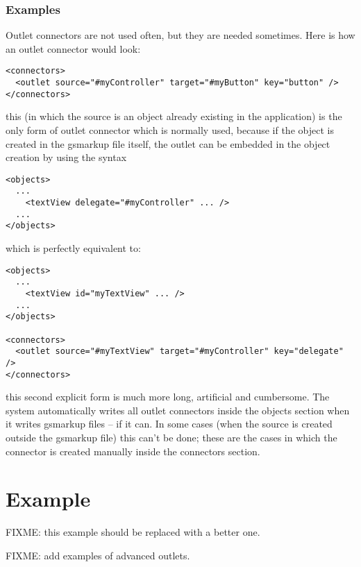 \subsubsection{Examples}
Outlet connectors are not used often, but they are needed sometimes.
Here is how an outlet connector would look:
\begin{verbatim}
<connectors>
  <outlet source="#myController" target="#myButton" key="button" />
</connectors>
\end{verbatim}
this (in which the source is an object already existing in the
application) is the only form of outlet connector which is normally
used, because if the object is created in the gsmarkup file itself, the outlet
can be embedded in the object creation by using the syntax
\begin{verbatim}
<objects>
  ...
    <textView delegate="#myController" ... />
  ...
</objects>
\end{verbatim}
which is perfectly equivalent to:
\begin{verbatim}
<objects>
  ...
    <textView id="myTextView" ... />
  ...
</objects>

<connectors>
  <outlet source="#myTextView" target="#myController" key="delegate" />
</connectors>
\end{verbatim}
this second explicit form is much more long, artificial and
cumbersome.  The system automatically writes all outlet connectors
inside the objects section when it writes gsmarkup files -- if it can.  In
some cases (when the source is created outside the gsmarkup file) this
can't be done; these are the cases in which the connector is created
manually inside the connectors section.

\section{Example}

FIXME: this example should be replaced with a better one.

FIXME: add examples of advanced outlets.

